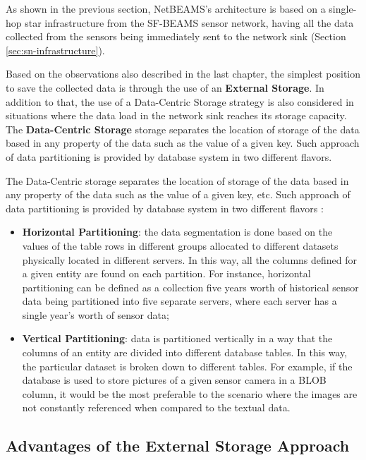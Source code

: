 As shown in the previous section, NetBEAMS's architecture is based on a
single-hop star infrastructure from the SF-BEAMS sensor network, having all the
data collected from the sensors being immediately sent to the network sink
(Section \ref{sec:sn-infrastructure}).

Based on the observations also described in the last chapter, the simplest
position to save the collected data is through the use of an \textbf{External
Storage}. In addition to that, the use of a Data-Centric Storage strategy is
also considered in situations where the data load in the network sink reaches
its storage capacity. The \textbf{Data-Centric Storage} storage separates the
location of storage of the data based in any property of the data such as the
value of a given key. Such approach of data partitioning is provided by
database system in two different flavors.

The Data-Centric storage separates the location of storage of the data based in
any property of the data such as the value of a given key, etc. Such approach
of data partitioning is provided by database system in two different flavors
\cite{db-partitioning-relational}:

\begin{itemize}
  \item \textbf{Horizontal Partitioning}: the data segmentation is done based
  on the values of the table rows in different groups allocated to different
  datasets physically located in different servers. In this way, all the
  columns defined for a given entity are found on each partition. For instance,
  horizontal partitioning can be defined as a collection five years worth of
  historical sensor data being partitioned into five separate servers, where
  each server has a single year's worth of sensor data;
  \item \textbf{Vertical Partitioning}: data is partitioned vertically in a way
  that the  columns of an entity are divided into different database tables. In
  this way,  the particular dataset is broken down to different tables. For
  example, if the  database is used to store pictures of a given sensor camera
  in a BLOB column, it would be the most preferable to the scenario where the
  images are not  constantly referenced when compared to the textual data.
\end{itemize} 

\subsection{Advantages of the External Storage Approach}

